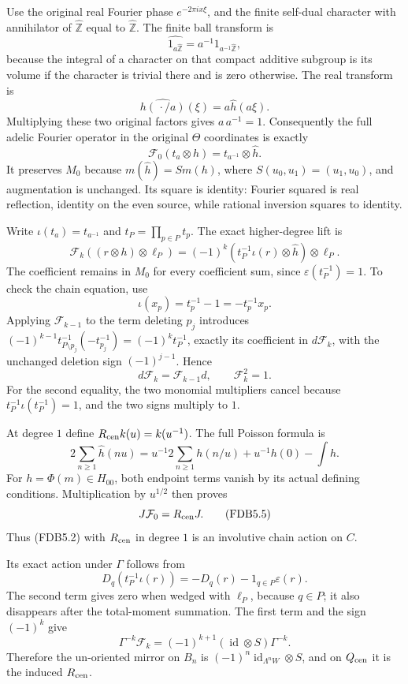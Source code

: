 Use the original real Fourier phase \(e^{-2\pi ix\xi}\), and the finite
self-dual character with annihilator of \(\widehat{\mathbb Z}\) equal to
\(\widehat{\mathbb Z}\). The finite ball transform is \[
\widehat{1_{a\widehat{\mathbb Z}}}
=a^{-1}1_{a^{-1}\widehat{\mathbb Z}},
\] because the integral of a character on that compact additive subgroup
is its volume if the character is trivial there and is zero otherwise.
The real transform is \[
\widehat{h(\,\cdot/a)}(\xi)=a\widehat h(a\xi).
\] Multiplying these two original factors gives \(a\,a^{-1}=1\).
Consequently the full adelic Fourier operator in the original \(\Theta\)
coordinates is exactly \[
\mathcal F_0(t_a\otimes h)=t_{a^{-1}}\otimes\widehat h.
\tag{FDB5.1}
\] It preserves \(M_0\) because \(m(\widehat h)=S m(h)\), where
\(S(u_0,u_1)=(u_1,u_0)\), and augmentation is unchanged. Its square is
identity: Fourier squared is real reflection, identity on the even
source, while rational inversion squares to identity.

Write \(\iota(t_a)=t_{a^{-1}}\) and \(t_P=\prod_{p\in P}t_p\). The exact
higher-degree lift is \[
\mathcal F_k((r\otimes h)\otimes\ell_P)
=(-1)^k(t_P^{-1}\iota(r)\otimes\widehat h)\otimes\ell_P.
\tag{FDB5.2}
\] The coefficient remains in \(M_0\) for every coefficient sum, since
\(\varepsilon(t_P^{-1})=1\). To check the chain equation, use \[
\iota(x_p)=t_p^{-1}-1=-t_p^{-1}x_p.
\] Applying \(\mathcal F_{k-1}\) to the term deleting \(p_j\) introduces
\((-1)^{k-1}t_{P\setminus p_j}^{-1}(-t_{p_j}^{-1})
=(-1)^k t_P^{-1}\), exactly its coefficient in \(d\mathcal F_k\), with
the unchanged deletion sign \((-1)^{j-1}\). Hence \[
d\mathcal F_k=\mathcal F_{k-1}d,\qquad \mathcal F_k^2=1.
\tag{FDB5.3}
\] For the second equality, the two monomial multipliers cancel because
\(t_P^{-1}\iota(t_P^{-1})=1\), and the two signs multiply to \(1\).

At degree \(1\) define \(R_{\rm cen}k(u)=k(u^{-1})\). The full Poisson
formula is \[
2\sum_{n\ge1}\widehat h(nu)
=u^{-1}2\sum_{n\ge1}h(n/u)+u^{-1}h(0)-\int h.
\tag{FDB5.4}
\] For \(h=\Phi(m)\in H_{00}\), both endpoint terms vanish by its actual
defining conditions. Multiplication by \(u^{1/2}\) then proves \[
J\mathcal F_0=R_{\rm cen}J.
\tag{FDB5.5}
\] Thus (FDB5.2) with \(R_{\rm cen}\) in degree \(1\) is an involutive
chain action on \(C\).

Its exact action under \(\Gamma\) follows from \[
D_q(t_P^{-1}\iota(r))=-D_q(r)-1_{q\in P}\varepsilon(r).
\tag{FDB5.6}
\] The second term gives zero when wedged with \(\ell_P\), because
\(q\in P\); it also disappears after the total-moment summation. The
first term and the sign \((-1)^k\) give \[
\Gamma^{-k}\mathcal F_k
=(-1)^{k+1}(\operatorname{id}\otimes S)\Gamma^{-k}.
\tag{FDB5.7}
\] Therefore the un-oriented mirror on \(B_n\) is
\((-1)^n\operatorname{id}_{\Lambda^nW}\otimes S\), and on
\(Q_{\rm cen}\) it is the induced \(R_{\rm cen}\).

